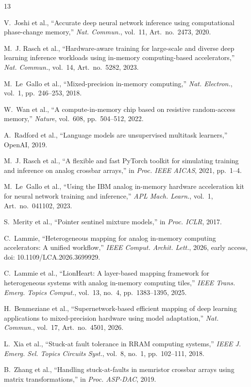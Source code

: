\documentclass[journal]{IEEEtran}
\begin{document}
\begin{thebibliography}{13}

V.~Joshi et al., ``Accurate deep neural network inference using
computational phase-change memory,'' \emph{Nat. Commun.}, vol.~11,
Art.~no.~2473, 2020.

M.~J. Rasch et al., ``Hardware-aware training for large-scale and
diverse deep learning inference workloads using in-memory
computing-based accelerators,'' \emph{Nat. Commun.}, vol.~14,
Art.~no.~5282, 2023.

M.~Le~Gallo et al., ``Mixed-precision in-memory computing,''
\emph{Nat. Electron.}, vol.~1, pp.~246--253, 2018.

W.~Wan et al., ``A compute-in-memory chip based on resistive
random-access memory,'' \emph{Nature}, vol.~608, pp.~504--512, 2022.

A.~Radford et al., ``Language models are unsupervised multitask
learners,'' OpenAI, 2019.

M.~J. Rasch et al., ``A flexible and fast PyTorch toolkit for
simulating training and inference on analog crossbar arrays,'' in
\emph{Proc. IEEE AICAS}, 2021, pp.~1--4.

M.~Le~Gallo et al., ``Using the IBM analog in-memory hardware
acceleration kit for neural network training and inference,''
\emph{APL Mach. Learn.}, vol.~1, Art.~no.~041102, 2023.

S.~Merity et al., ``Pointer sentinel mixture models,'' in
\emph{Proc. ICLR}, 2017.

C.~Lammie, ``Heterogeneous mapping for analog in-memory computing
accelerators: A unified workflow,'' \emph{IEEE Comput. Archit. Lett.},
2026, early access, doi: 10.1109/LCA.2026.3699929.

C.~Lammie et al., ``LionHeart: A layer-based mapping framework
for heterogeneous systems with analog in-memory computing tiles,''
\emph{IEEE Trans. Emerg. Topics Comput.}, vol.~13, no.~4,
pp.~1383--1395, 2025.

H.~Benmeziane et al., ``Supernetwork-based efficient mapping of
deep learning applications to mixed-precision hardware using model
adaptation,'' \emph{Nat. Commun.}, vol.~17, Art.~no.~4501, 2026.

L.~Xia et al., ``Stuck-at fault tolerance in RRAM computing
systems,'' \emph{IEEE J. Emerg. Sel. Topics Circuits Syst.}, vol.~8,
no.~1, pp.~102--111, 2018.

B.~Zhang et al., ``Handling stuck-at-faults in memristor crossbar
arrays using matrix transformations,'' in \emph{Proc. ASP-DAC}, 2019.

\end{thebibliography}
\end{document}
